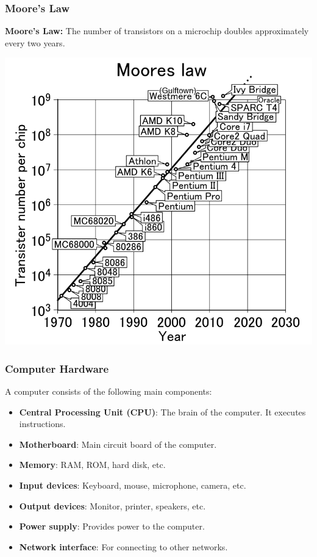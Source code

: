 \documentclass{beamer}
\begin{document}
\begin{frame}
  \frametitle{Moore's Law}

  \begin{minipage}{0.3\textwidth}
    \vspace{-1cm}
    \textbf{Moore's Law:}
    The number of transistors on a microchip doubles approximately every two years.
    \end{minipage}
    \begin{minipage}{0.68\textwidth}
    \vspace{-1cm}
    \begin{center}
    \includegraphics[width=\textwidth]{fig/Moores_law.png}
    \end{center}
    \vspace{-1cm}
    \end{minipage}
\end{frame}
\begin{frame}
  \frametitle{Computer Hardware}
  A computer consists of the following main components:
  \begin{itemize}
    \item \textbf{Central Processing Unit (CPU)}: The brain of the computer. It executes instructions.
    \item \textbf{Motherboard}: Main circuit board of the computer.
    \item \textbf{Memory}: RAM, ROM, hard disk, etc.
    \item \textbf{Input devices}: Keyboard, mouse, microphone, camera, etc.
    \item \textbf{Output devices}: Monitor, printer, speakers, etc.
    \item \textbf{Power supply}: Provides power to the computer.
    \item \textbf{Network interface}: For connecting to other networks.
  \end{itemize}
\end{frame}
\end{document}
